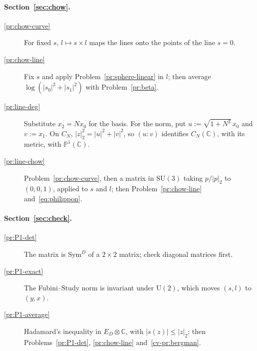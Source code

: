 \documentclass[reqno]{amsart}
\theoremstyle{definition}
\theoremstyle{plain}
\newcommand{\C}{\mathbb{C}}
\newcommand{\Pb}{\mathbb{P}}
\begin{document}
\paragraph{Section~\ref{sec:chow}.}
\begin{description}
\item[\ref{pr:chow-curve}] For fixed \(s\), \(l \mapsto s \times l\) maps the lines onto the points of the line \(s = 0\).
\item[\ref{pr:chow-line}] Fix \(s\) and apply Problem~\ref{pr:sphere-linear} in \(l\); then average \(\log(\lvert s_0 \rvert^2 + \lvert s_1 \rvert^2)\) with Problem~\ref{pr:beta}.
\item[\ref{pr:line-deg}] Substitute \(x_2 = Nx_0\) for the basis.  For the norm, put \(u := \sqrt{1 + N^2}\, x_0\) and \(v := x_1\).  On \(C_N\), \(\lvert z \rvert_2^2 = \lvert u \rvert^2 + \lvert v \rvert^2\), so \((u : v)\) identifies \(C_N(\C)\), with its metric, with \(\Pb^1(\C)\).
\item[\ref{pr:line-chow}] Problem~\ref{pr:chow-curve}, then a matrix in \(\mathrm{SU}(3)\) taking \(p/\lvert p \rvert_2\) to \((0, 0, 1)\), applied to \(s\) and \(l\); then Problem~\ref{pr:chow-line} and~\eqref{eq:philippon}.
\end{description}
\paragraph{Section~\ref{sec:check}.}
\begin{description}
\item[\ref{pr:P1-det}] The matrix is \(\mathrm{Sym}^D\) of a \(2 \times 2\) matrix; check diagonal matrices first.
\item[\ref{pr:P1-exact}] The Fubini--Study norm is invariant under \(\mathrm{U}(2)\), which moves \((s, l)\) to \((y, x)\).
\item[\ref{pr:P1-average}] Hadamard's inequality in \(E_D \otimes \C\), with \(\lvert s(z) \rvert \le \lvert z \rvert_2\); then Problems~\ref{pr:P1-det}, \ref{pr:chow-line} and~\ref{cv-pr:bergman}.
\end{description}
\end{document}
